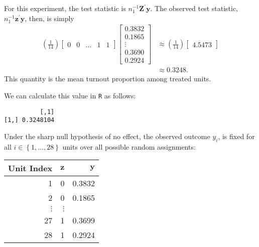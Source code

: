 \documentclass[
  12pt,
  leqno]{article}
\newenvironment{Shaded}{\begin{snugshade}}{\end{snugshade}}
\newcommand{\DecValTok}[1]{\textcolor[rgb]{0.00,0.00,0.81}{#1}}
\newcommand{\DocumentationTok}[1]{\textcolor[rgb]{0.56,0.35,0.01}{\textbf{\textit{#1}}}}
\newcommand{\FunctionTok}[1]{\textcolor[rgb]{0.00,0.00,0.00}{#1}}
\newcommand{\NormalTok}[1]{#1}
\newcommand{\SpecialCharTok}[1]{\textcolor[rgb]{0.00,0.00,0.00}{#1}}
\DeclareMathOperator{\1}{\mathbbm{1}}
\begin{document}
For this experiment, the test statistic is
\(n_1^{-1}\mathbf{Z}^{\prime}\mathbf{y}\). The observed test statistic,
\(n_1^{-1}\mathbf{z}^{\prime}\mathbf{y}\), then, is simply
\begin{align*}
\left(\frac{1}{14}\right) \begin{bmatrix} 0 & 0 & \dots & 1 & 1 \end{bmatrix} \begin{bmatrix}  0.3832 \\ 0.1865 \\ \vdots \\ 0.3690 \\ 0.2924 \end{bmatrix} & \approx \left(\frac{1}{14}\right)\begin{bmatrix} 4.5473 \end{bmatrix} \\
& \approx 0.3248.
\end{align*} This quantity is the mean turnout proportion among treated
units.

We can calculate this value in \texttt{R} as follows: \scriptsize

\begin{Shaded}
\end{Shaded}

\begin{verbatim}
          [,1]
[1,] 0.3248104
\end{verbatim}

\normalsize

Under the sharp null hypothesis of no effect, the observed outcome
\(y_i\), is fixed for all \(i \in \left\{1 , \dots , 28\right\}\) units
over all possible random assignments:

\begin{table}[ht]
\centering
\begin{tabular}{rrr}
\hline
Unit Index & $\mathbf{z}$ & $\mathbf{y}$ \\ 
\hline
1  & 0  & 0.3832  \\ 
2  & 0  & 0.1865  \\ 
$\vdots$ & $\vdots$ \\ 
27 & 1  & 0.3699 \\ 
28 & 1  & 0.2924 \\ 
\hline
\end{tabular}
\end{table}
\end{document}
